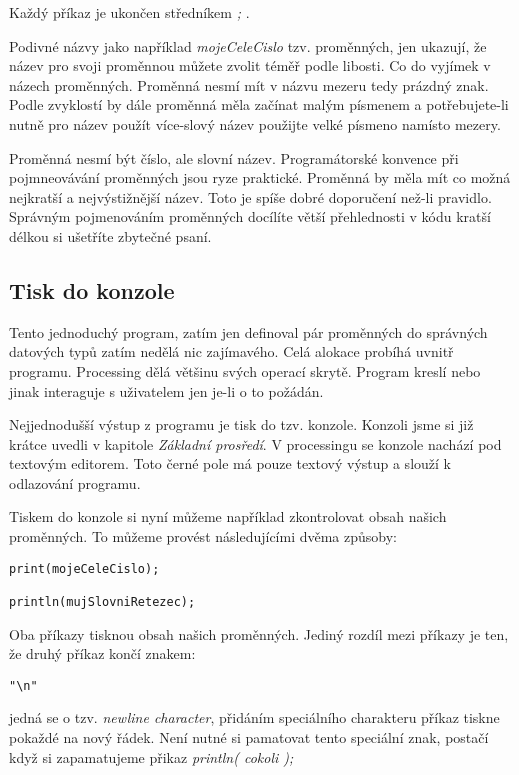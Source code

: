 \documentclass[11pt]{article}
\begin{document}
Každý příkaz je ukončen středníkem {\em ;} .

Podivné názvy jako například {\em mojeCeleCislo} tzv. proměnných, jen ukazují, že název pro svoji proměnnou můžete zvolit téměř podle libosti. Co do vyjímek v názech proměnných. Proměnná nesmí mít v názvu mezeru tedy prázdný znak. Podle zvyklostí by dále proměnná měla začínat malým písmenem a potřebujete-li nutně pro název použít více-slový název použijte velké písmeno namísto mezery.

Proměnná nesmí být číslo, ale slovní název. Programátorské konvence při pojmneovávání proměnných jsou ryze praktické. Proměnná by měla mít co možná nejkratší a nejvýstižnější název.  Toto je spíše dobré doporučení než-li pravidlo. Správným pojmenováním proměnných docílíte větší přehlednosti v kódu kratší délkou si ušetříte zbytečné psaní.

\subsection{Tisk do konzole}

Tento jednoduchý program, zatím jen definoval pár proměnných do správných datových typů zatím nedělá nic zajímavého. Celá alokace probíhá uvnitř programu. Processing dělá většinu svých operací skrytě. Program kreslí nebo jinak interaguje s uživatelem jen je-li o to požádán.

Nejjednodušší výstup z programu je tisk do tzv. konzole. Konzoli jsme si již krátce uvedli v kapitole {\em Základní prosředí}. V processingu se konzole nachází pod textovým editorem. Toto černé pole má pouze textový výstup a slouží k odlazování programu.

Tiskem do konzole si nyní můžeme například zkontrolovat obsah našich proměnných. To můžeme provést následujícími dvěma způsoby:


\begin{lstlisting}
print(mojeCeleCislo);

println(mujSlovniRetezec);
\end{lstlisting}

Oba příkazy tisknou obsah našich proměnných. Jediný rozdíl mezi příkazy je ten, že druhý příkaz končí znakem:
 
\begin{lstlisting}
"\n"
\end{lstlisting}

jedná se o tzv. {\em newline character}, přidáním speciálního charakteru příkaz tiskne pokaždé na nový řádek. Není nutné si pamatovat tento speciální znak, postačí když si zapamatujeme přikaz {\em println( cokoli );}
\end{document}
